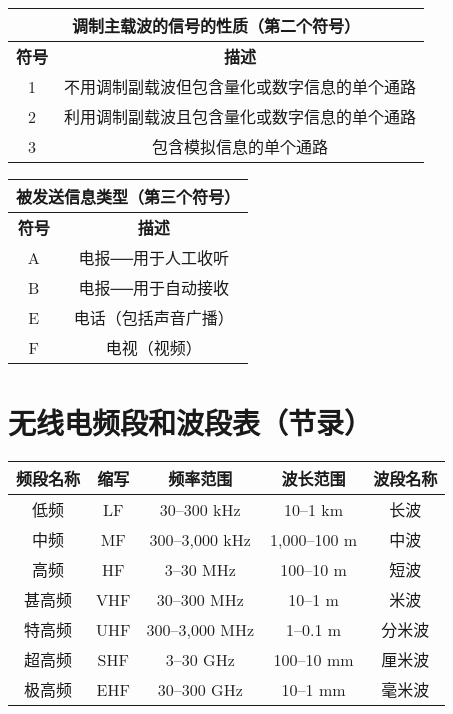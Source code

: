 \bigskip

\begin{tabular}{|c|c|}
	\hline
	\multicolumn{2}{|c|}{\textbf{调制主载波的信号的性质（第二个符号）}} \\
	\hline
	\textbf{符号} & \textbf{描述} \\
	\hline
	1 & 不用调制副载波但包含量化或数字信息的单个通路 \\
	\hline
	2 & 利用调制副载波且包含量化或数字信息的单个通路 \\
	\hline
	3 & 包含模拟信息的单个通路 \\
	\hline
\end{tabular}

\bigskip

\begin{tabular}{|c|c|}
	\hline
	\multicolumn{2}{|c|}{\textbf{被发送信息类型（第三个符号）}} \\
	\hline
	\textbf{符号} & \textbf{描述} \\
	\hline
	A & 电报──用于人工收听 \\
	\hline
	B & 电报──用于自动接收 \\
	\hline
	E & 电话（包括声音广播） \\
	\hline
	F & 电视（视频） \\
	\hline
\end{tabular}

\newpage

\section{无线电频段和波段表（节录）}

\begin{tabular}{|c|c|c|c|c|}
	\hline
	\textbf{频段名称} & \textbf{缩写} & \textbf{频率范围} & \textbf{波长范围} & \textbf{波段名称} \\
	\hline
	低频 & LF & 30–300 \si{\kHz} & 10–1 km & 长波 \\
	\hline
	中频 & MF & 300–3,000 \si{\kHz} & 1,000–100 m & 中波 \\
	\hline
	高频 & HF & 3–30 \si{\MHz} & 100–10 m & 短波 \\
	\hline
	甚高频 & VHF & 30–300 \si{\MHz} & 10–1 m & 米波 \\
	\hline
	特高频 & UHF & 300–3,000 \si{\MHz} & 1–0.1 m & 分米波 \\
	\hline
	超高频 & SHF & 3–30 \si{\GHz} & 100–10 mm & 厘米波 \\
	\hline
	极高频 & EHF & 30–300 \si{\GHz} & 10–1 mm & 毫米波 \\
	\hline
\end{tabular}


